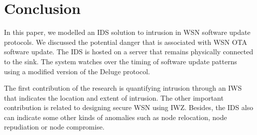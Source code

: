\documentclass{CRPITStyle}
\begin{document}


\section{Conclusion}
\label{sec:concl}

In this paper, we modelled an IDS solution to intrusion in WSN software update protocols.
We discussed the potential danger that is associated with WSN OTA software update.
The IDS is hosted on a server that remains physically connected to the  sink. 
The system watches over the timing of software update patterns using a modified version of the Deluge protocol.

The first contribution of the research is quantifying intrusion through an IWS that indicates the location and extent of intrusion.
The other important contribution is related to designing secure WSN using IWZ.
Besides, the IDS also can indicate some other kinds of anomalies such as node relocation, node repudiation or node compromise.
\end{document}
